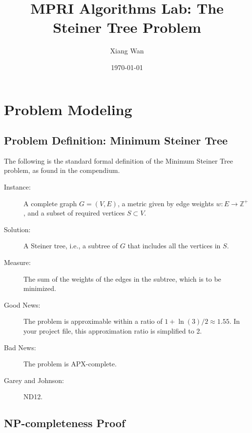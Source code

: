 \documentclass{article}
\title{MPRI Algorithms Lab: The Steiner Tree Problem}
\author{Xiang Wan}
\date{\today} %
\begin{document}
\maketitle %

\section{Problem Modeling}

\subsection{Problem Definition: Minimum Steiner Tree}
\label{sec:problem_definition_en}

The following is the standard formal definition of the Minimum Steiner Tree problem, as found in the compendium.

\begin{description}
    \item[Instance:] 
    A complete graph $G=(V,E)$, a metric given by edge weights $w: E \to \mathbb{Z}^+$, and a subset of required vertices $S \subset V$.

    \item[Solution:] 
    A Steiner tree, i.e., a subtree of $G$ that includes all the vertices in $S$.

    \item[Measure:] 
    The sum of the weights of the edges in the subtree, which is to be minimized.

    \item[Good News:] 
    The problem is approximable within a ratio of $1+\ln(3)/2 \approx 1.55$. In your project file, this approximation ratio is simplified to 2.

    \item[Bad News:] 
    The problem is APX-complete.
    
    \item[Garey and Johnson:] ND12.
\end{description}

\subsection{NP-completeness Proof}
\label{sec:np_completeness_proof}
\end{document}
